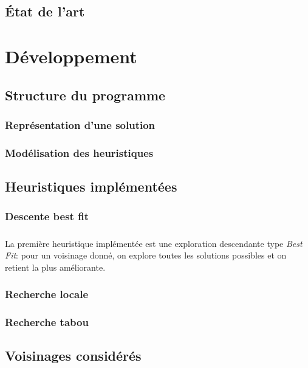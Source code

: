 \documentclass[a4paper,10pt]{report}
\begin{document}
\pagebreak
\section{État de l'art}


\pagebreak
\chapter{Développement}
\section{Structure du programme}
\subsection{Représentation d'une solution}


\subsection{Modélisation des heuristiques}



\section{Heuristiques implémentées}
\subsection{Descente best fit}
\paragraph{}
La première heuristique implémentée est une exploration descendante type \textit{Best Fit}: pour un voisinage donné,
on explore toutes les solutions possibles et on retient la plus améliorante. 

\subsection{Recherche locale}

\subsection{Recherche tabou}

\section{Voisinages considérés}
\end{document}
